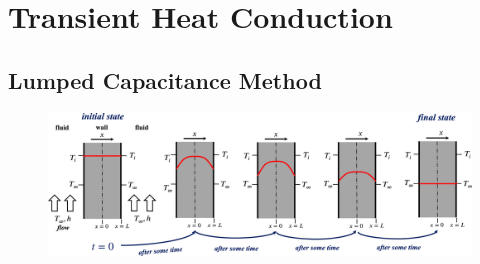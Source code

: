 \documentclass[12pt, a4paper]{article}
\begin{document}


\newpage
\section{Transient Heat Conduction}
\subsection{Lumped Capacitance Method}
\begin{figure}[H]
    \centering
    \includegraphics[width=\textwidth]{img/temporal_propagation.eps}
\end{figure}
\end{document}
